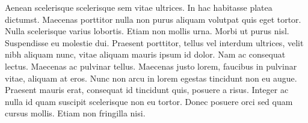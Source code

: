 Aenean scelerisque scelerisque sem vitae ultrices. In hac habitasse platea dictumst. Maecenas porttitor nulla non purus aliquam volutpat quis eget tortor. Nulla scelerisque varius lobortis. Etiam non mollis urna. Morbi ut purus nisl. Suspendisse eu molestie dui. Praesent porttitor, tellus vel interdum ultrices, velit nibh aliquam nunc, vitae aliquam mauris ipsum id dolor. Nam ac consequat lectus. Maecenas ac pulvinar tellus. Maecenas justo lorem, faucibus in pulvinar vitae, aliquam at eros. Nunc non arcu in lorem egestas tincidunt non eu augue. Praesent mauris erat, consequat id tincidunt quis, posuere a risus. Integer ac nulla id quam suscipit scelerisque non eu tortor. Donec posuere orci sed quam cursus mollis. Etiam non fringilla nisi. 